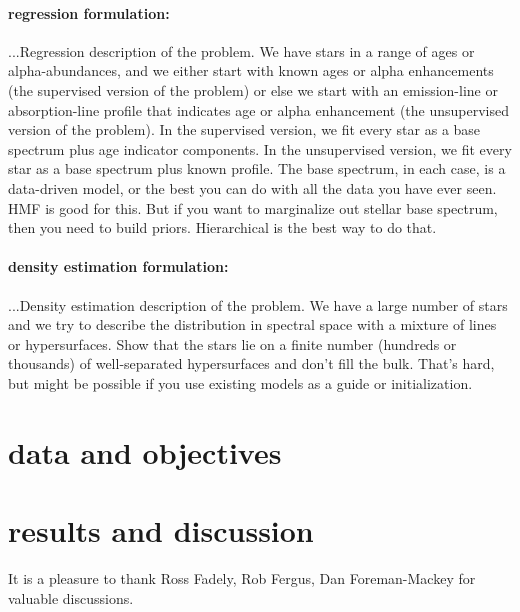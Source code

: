 \documentclass[12pt, preprint]{aastex}
\begin{document}
\paragraph{regression formulation:}
...Regression description of the problem.  We have stars in a range of
ages or alpha-abundances, and we either start with known ages or alpha
enhancements (the supervised version of the problem) or else we start
with an emission-line or absorption-line profile that indicates age or
alpha enhancement (the unsupervised version of the problem).  In the
supervised version, we fit every star as a base spectrum plus age
indicator components.  In the unsupervised version, we fit every star
as a base spectrum plus known profile.  The base spectrum, in each
case, is a data-driven model, or the best you can do with all the data
you have ever seen.  HMF is good for this.  But if you want to
marginalize out stellar base spectrum, then you need to build priors.
Hierarchical is the best way to do that.

\paragraph{density estimation formulation:}
...Density estimation description of the problem.  We have a large
number of stars and we try to describe the distribution in spectral
space with a mixture of lines or hypersurfaces.  Show that the stars
lie on a finite number (hundreds or thousands) of well-separated
hypersurfaces and don't fill the bulk.  That's hard, but might be
possible if you use existing models as a guide or initialization.

\section{data and objectives}

\section{results and discussion}

\acknowledgements It is a pleasure to thank
  Ross Fadely,
  Rob Fergus,
  Dan Foreman-Mackey
for valuable discussions.
\end{document}
